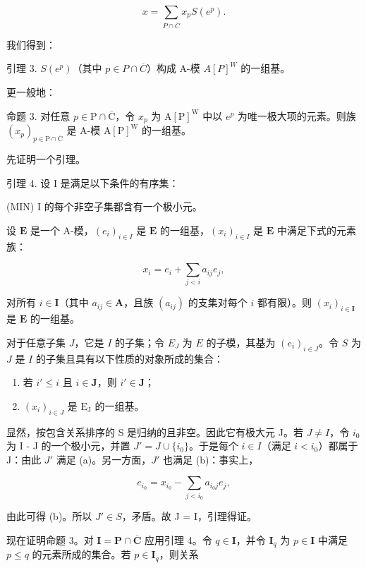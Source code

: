 \[
x = \sum_ {P \cap \overline {{C}}} x _ {p} S (e ^ {p}).\tag{6}
\]

我们得到：

引理 3. \(S(e^p)\)（其中 \(p \in P \cap \overline{C}\)）构成 A-模 \(A[P]^W\) 的一组基。

更一般地：

命题 3. 对任意 \(p \in \mathrm{P} \cap \overline{\mathrm{C}}\)，令 \(x_p\) 为 \(\mathrm{A}[\mathrm{P}]^{\mathrm{W}}\) 中以 \(e^p\) 为唯一极大项的元素。则族 \((x_p)_{p \in \mathrm{P} \cap \overline{\mathrm{C}}}\) 是 A-模 \(\mathrm{A}[\mathrm{P}]^{\mathrm{W}}\) 的一组基。

先证明一个引理。

引理 4. 设 I 是满足以下条件的有序集：

(MIN) I 的每个非空子集都含有一个极小元。

设 \(\mathbf{E}\) 是一个 A-模，\((e_i)_{i \in I}\) 是 \(\mathbf{E}\) 的一组基，\((x_i)_{i \in I}\) 是 \(\mathbf{E}\) 中满足下式的元素族：

\[
x _ {i} = e _ {i} + \sum_ {j <   i} a _ {i j} e _ {j},
\]

对所有 \(i \in \mathbf{I}\)（其中 \(a_{ij} \in \mathbf{A}\)，且族 \((a_{ij})\) 的支集对每个 \(i\) 都有限）。则 \((x_i)_{i \in \mathbf{I}}\) 是 \(\mathbf{E}\) 的一组基。

对于任意子集 \(J\)，它是 \(I\) 的子集；令 \(E_J\) 为 \(E\) 的子模，其基为 \((e_i)_{i \in J}\)。令 \(S\) 为 \(J\) 是 \(I\) 的子集且具有以下性质的对象所成的集合：

\begin{enumerate}
\def\labelenumi{(\alph{enumi})}
\item
  若 \(i' \leqslant i\) 且 \(i \in \mathbf{J}\)，则 \(i' \in \mathbf{J}\)；
\item
  \((x_{i})_{i\in J}\) 是 \(\mathrm{E_J}\) 的一组基。
\end{enumerate}

显然，按包含关系排序的 S 是归纳的且非空。因此它有极大元 J。若 \(J \neq I\)，令 \(i_{0}\) 为 I - J 的一个极小元，并置 \(J' = J \cup \{i_{0}\}\)。于是每个 \(i \in I\)（满足 \(i < i_{0}\)）都属于 J：由此 \(J'\) 满足 (a)。另一方面，\(J'\) 也满足 (b)：事实上，

\[
e _ {i _ {0}} = x _ {i _ {0}} - \sum_ {j <   i _ {0}} a _ {i _ {0} j} e _ {j},
\]

由此可得 (b)。所以 \(J' \in S\)，矛盾。故 J = I，引理得证。

现在证明命题 3。对 \(\mathbf{I} = \mathbf{P} \cap \overline{\mathbf{C}}\) 应用引理 4。令 \(q \in \mathbf{I}\)，并令 \(\mathbf{I}_q\) 为 \(p \in \mathbf{I}\) 中满足 \(p \leqslant q\) 的元素所成的集合。若 \(p \in \mathbf{I}_q\)，则关系

